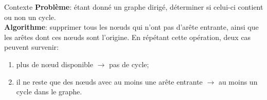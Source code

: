 \begin{frame}{Contexte}
\textbf{Problème}: étant donné un graphe dirigé, déterminer si celui-ci contient ou non un cycle.\\
\vspace{0.5cm}
\textbf{Algorithme}: supprimer tous les nœuds qui n'ont pas d'arête entrante, ainsi que les arêtes dont ces nœuds sont l'origine. En répétant cette opération, deux cas peuvent survenir: 
\begin{enumerate}
\item plus de nœud disponible $\rightarrow$ pas de cycle;
\item il ne reste que des nœuds avec au moins une arête entrante $\rightarrow$ au moins un cycle dans le graphe.
\end{enumerate}
\end{frame}
